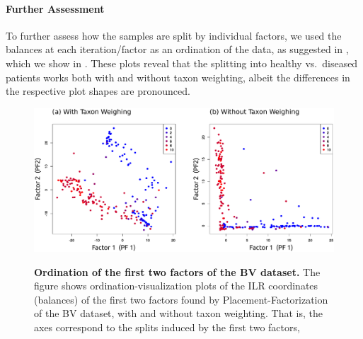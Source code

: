\paragraph{Further Assessment}
\label{ch:Factorization:sec:Evaluation:sub:BVDataset:par:FurtherAssessment}

To further assess how the samples are split by individual factors,
we used the balances at each iteration/factor as an ordination of the data, as suggested in ,
which we show in .
These plots reveal that the splitting into healthy vs.~diseased patients works both with and without taxon weighting,
albeit the differences in the respective plot shapes are pronounced.

\begin{figure}[!htb]
    \centering
     \includegraphics[width=\linewidth]{pdf/pf_bv_place_ilr_ordination.pdf}
    \begin{subfigure}{0pt}
        \label{fig:pf_bv_place_ilr_ordination:sub:with_taxon_weighting}
    \end{subfigure}
    \begin{subfigure}{0pt}
        \label{fig:pf_bv_place_ilr_ordination:sub:without_taxon_weighting}
    \end{subfigure}
    \caption[Ordination of the first two factors of the \acs{BV} dataset]{
        \textbf{Ordination of the first two factors of the \ac{BV} dataset.}
        The figure shows ordination-visualization plots of the ILR coordinates (balances) of the first two factors
        found by Placement-Factorization of the \ac{BV} dataset,
         with and
         without taxon weighting.
        That is, the axes correspond to the splits induced by the first two factors,
}
\end{figure}
